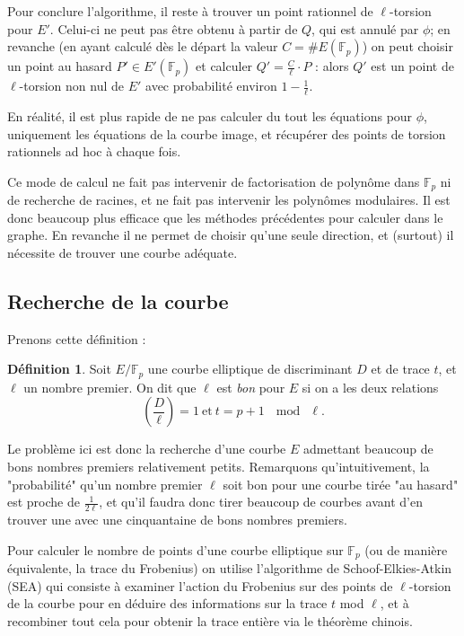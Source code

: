 \documentclass[11pt,a4paper]{article}
\newcommand{\F}{\mathbb{F}}
\theoremstyle{definition}
\newtheorem{defi}[thm]{Définition}
\begin{document}
Pour conclure l'algorithme, il reste à trouver un point rationnel de $\ell$-torsion pour $E'$. Celui-ci ne peut pas être obtenu à partir de $Q$, qui est annulé par $\phi$; en revanche (en ayant calculé dès le départ la valeur $C=\#E(\F_p)$) on peut choisir un point au hasard $P'\in E'(\F_p)$ et calculer $Q'=\frac{C}{\ell}\cdot P$ : alors $Q'$ est un point de $\ell$-torsion non nul de $E'$ avec probabilité environ $1-\frac{1}{\ell}$.

En réalité, il est plus rapide de ne pas calculer du tout les équations pour $\phi$, uniquement les équations de la courbe image, et récupérer des points de torsion rationnels ad hoc à chaque fois.

Ce mode de calcul ne fait pas intervenir de factorisation de polynôme dans $\F_p$ ni de recherche de racines, et ne fait pas intervenir les polynômes modulaires. Il est donc beaucoup plus efficace que les méthodes précédentes pour calculer dans le graphe. En revanche il ne permet de choisir qu'une seule direction, et (surtout) il nécessite de trouver une courbe adéquate.


\newpage

\subsection{Recherche de la courbe}

Prenons cette définition :

\begin{defi}
Soit $E/\F_p$ une courbe elliptique de discriminant $D$ et de trace $t$, et $\ell$ un nombre premier. On dit que $\ell$ est \emph{bon} pour $E$ si on a les deux relations
$$ \left(\frac{D}{\ell}\right)=1\ \text{et}\ t=p+1\ \mod\ \ell.$$
\end{defi}

Le problème ici est donc la recherche d'une courbe $E$ admettant beaucoup de bons nombres premiers relativement petits. Remarquons qu'intuitivement, la "probabilité" qu'un nombre premier $\ell$ soit bon pour une courbe tirée "au hasard" est proche de $\frac{1}{2\ell}$, et qu'il faudra donc tirer beaucoup de courbes avant d'en trouver une avec une cinquantaine de bons nombres premiers.

Pour calculer le nombre de points d'une courbe elliptique sur $\F_p$ (ou de manière équivalente, la trace du Frobenius) on utilise l'algorithme de Schoof-Elkies-Atkin (SEA) qui consiste à examiner l'action du Frobenius sur des points de $\ell$-torsion de la courbe pour en déduire des informations sur la trace $t$ mod $\ell$, et à recombiner tout cela pour obtenir la trace entière via le théorème chinois.
\end{document}
